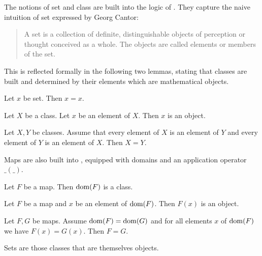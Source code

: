\documentclass{article}
\begin{document}
The notions of set and class are built into the
logic of \Naproche{}. They capture the naive intuition
of set expressed by Georg Cantor:
%
\begin{quotation}
\noindent A set is a collection of definite, distinguishable objects 
of perception or thought conceived as a whole. 
The objects are called elements or members of the set.
\end{quotation}
%
This is reflected formally in the following two lemmas, stating
that classes are built and determined by their
elements which are mathematical objects.

\begin{forthel}

\begin{lemma} Let $x$ be set. Then $x = x$. \end{lemma}

\begin{proposition}
Let $X$ be a class. Let $x$ be an element of $X$.
Then $x$ is an object.
\end{proposition}

\begin{lemma}
    Let $X, Y$ be classes.
    Assume that every element of $X$ is an element of $Y$ and every element of
    $Y$ is an element of $X$.
    Then $X = Y$.
\end{lemma}

\end{forthel}

Maps are also built into \Naproche{}, equipped with
domains and an application operator $\_ ( \_ )$.

\begin{forthel}
  \begin{lemma}
    Let $F$ be a map.
    Then $\operatorname{dom}(F)$ is a class.
  \end{lemma}

  \begin{lemma}
    Let $F$ be a map and $x$ be an element of $\operatorname{dom}(F)$.
    Then $F(x)$ is an object.
  \end{lemma}

  \begin{lemma}
    Let $F, G$ be maps.
    Assume $\operatorname{dom}(F) = \operatorname{dom}(G)$ and for all elements $x$ of $\operatorname{dom}(F)$ we have
    $F(x) = G(x)$.
    Then $F = G$.
  \end{lemma}
\end{forthel}

Sets are those classes that are themselves objects.
\end{document}
